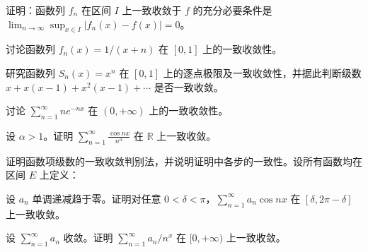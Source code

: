 \noindent\begin{minipage}{\textwidth}
证明：函数列 $f_n$ 在区间 $I$ 上一致收敛于 $f$ 的充分必要条件是 $\lim_{n\to\infty}\sup_{x\in I}|f_n(x)-f(x)|=0$。
\end{minipage}\par\vfill
\noindent\begin{minipage}{\textwidth}
讨论函数列 $f_n(x)=1/(x+n)$ 在 $[0,1]$ 上的一致收敛性。
\end{minipage}\par\vfill
\newpage
\noindent\begin{minipage}{\textwidth}
研究函数列 $S_n(x)=x^n$ 在 $[0,1]$ 上的逐点极限及一致收敛性，并据此判断级数 $x+x(x-1)+x^2(x-1)+\cdots$ 是否一致收敛。
\end{minipage}\par\vfill
\noindent\begin{minipage}{\textwidth}
讨论 $\displaystyle\sum_{n=1}^{\infty}ne^{-nx}$ 在 $(0,+\infty)$ 上的一致收敛性。
\end{minipage}\par\vfill
\noindent\begin{minipage}{\textwidth}
设 $\alpha>1$。证明 $\displaystyle\sum_{n=1}^{\infty}\frac{\cos nx}{n^\alpha}$ 在 $\mathbb R$ 上一致收敛。
\end{minipage}\par\vfill
\noindent\begin{minipage}{\textwidth}
证明函数项级数的一致收敛判别法，并说明证明中各步的一致性。设所有函数均在区间 $E$ 上定义：
\end{minipage}\par\vfill
\newpage
\noindent\begin{minipage}{\textwidth}
设 $a_n$ 单调递减趋于零。证明对任意 $0<\delta<\pi$，$\sum_{n=1}^{\infty}a_n\cos nx$ 在 $[\delta,2\pi-\delta]$ 上一致收敛。
\end{minipage}\par\vfill
\noindent\begin{minipage}{\textwidth}
设 $\sum_{n=1}^{\infty}a_n$ 收敛。证明 $\sum_{n=1}^{\infty}a_n/n^x$ 在 $[0,+\infty)$ 上一致收敛。
\end{minipage}\par\vfill
